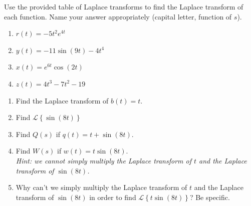 \documentclass[12pt]{article}
\newcommand{\ben}{\begin{enumerate}}
\newcommand{\een}{\end{enumerate}}
\newcommand{\<}{\langle}
\renewcommand{\>}{\rangle}
\renewcommand{\L}{\mathscr{L}}
\begin{document}
\item Use the provided table of Laplace transforms to find the Laplace transform of each function.
	Name your answer appropriately (capital letter, function of $s$).
	\ben
	\item $r(t) = -5t^2 e^{4t}$\\ \vfill
	\item $y(t) = -11\sin(9t) - 4t^4$\\ \vfill
	\item $x(t) = e^{6t} \cos(2t)$\\ \vfill
	\item $z(t) = 4t^3 - 7t^2 - 19$\\ \vfill
	\een

\newpage

\item	\ben
	\item Find the Laplace transform of $b(t) = t.$\\ \vfill
	\item Find $\L\left\{ \sin(8t) \right\}$\\ \vfill
	\item Find $Q(s)$ if $q(t) = t + \sin(8t).$\\ \vfill
	\item Find $W(s)$ if $w(t) = t \sin(8t).$\\
		{\it Hint: we cannot simply multiply the Laplace transform of $t$ and the Laplace transform of $\sin(8t)$.}\\ \vfill
	\item Why can't we simply multiply the Laplace transform of $t$ and the Laplace transform of $\sin(8t)$ 
		in order to find $\L \left\{ t \sin(8t) \right\}$? Be specific.\\ \vfill
	\een
\end{document}
